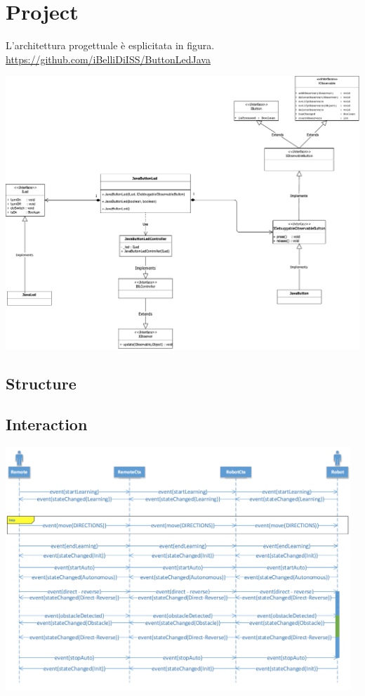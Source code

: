 \documentclass{llncs}
\newcommand{\labelsec}[1]{\label{sec:#1}}
\begin{document}
\section{Project}
\labelsec{Project}
L'architettura progettuale \`e esplicitata in figura.\\
\url{https://github.com/iBelliDiISS/ButtonLedJava}
\begin{center}
\includegraphics[scale=0.6]{img/graphs/Progettazione_BLS.pdf}
\end{center}

\subsection{Structure}
\subsection{Interaction}
\begin{center}
	\includegraphics[width=13cm]{img/interaction_project.png}
\end{center}
\end{document}
